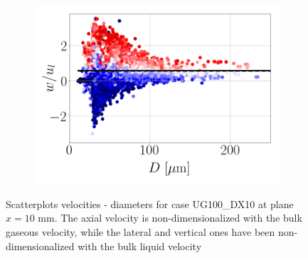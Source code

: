 \begin{figure}[ht]
\begin{subfigure}[b]{0.3\textwidth}
   \includegraphics[scale=0.2]{./part2_developments/figures_ch5_resolved_JICF/SPRAY_characterization/velocities/scatter_uz_D.png}
\end{subfigure}
   \caption[Scatterplots velocities - diameters for case UG100\_DX10 at plane $x = 10$ mm]{Scatterplots velocities - diameters for case UG100\_DX10 at plane $x = 10$ mm. The axial velocity is non-dimensionalized with the bulk gaseous velocity, while the lateral and vertical ones have been non-dimensionalized  with the bulk liquid velocity}
\label{fig:jicf_global_scatterplots}
\end{figure}

